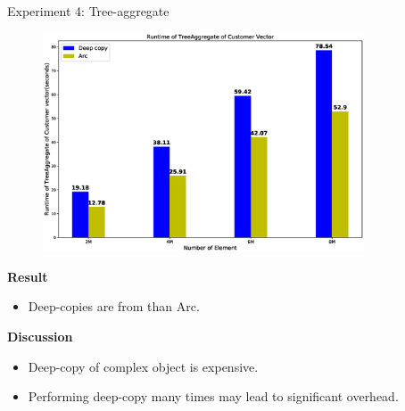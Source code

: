 \documentclass[9pt]{beamer}
\begin{document}
\begin{frame}[fragile]{Experiment 4: Tree-aggregate}
    \vspace{-0.5cm}
    \begin{figure}[hp]
        \centering
        \begin{center}
                \includegraphics[width=0.85\textwidth]{images/rust_tree_aggregate.eps}
                \captionsetup{labelformat=empty}
        \end{center}
    \end{figure}
    \vspace{-1.1cm}
    \textbf{Result}
    \begin{itemize}
        \item Deep-copies are from  than Arc.
    \end{itemize}

    \textbf{Discussion}
    \begin{itemize}
        \item Deep-copy of complex object is expensive.
        \item Performing deep-copy many times may lead to significant overhead.
    \end{itemize}

\end{frame}
\end{document}
